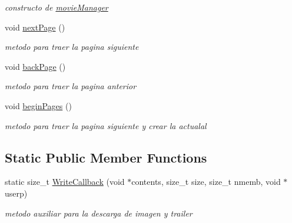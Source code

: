 \begin{DoxyCompactItemize}
\begin{DoxyCompactList}\small\item\em constructo de \hyperlink{classmovieManager}{movie\+Manager} \end{DoxyCompactList}\item 
\mbox{\label{classmovieManager_aa1111fc34f5a18cb534f55bf3dcdf0ac}} 
void \hyperlink{classmovieManager_aa1111fc34f5a18cb534f55bf3dcdf0ac}{next\+Page} ()
\begin{DoxyCompactList}\small\item\em metodo para traer la pagina siguiente \end{DoxyCompactList}\item 
\mbox{\label{classmovieManager_a4f3757c2b1d012f999fe46341a203ade}} 
void \hyperlink{classmovieManager_a4f3757c2b1d012f999fe46341a203ade}{back\+Page} ()
\begin{DoxyCompactList}\small\item\em metodo para traer la pagina anterior \end{DoxyCompactList}\item 
\mbox{\label{classmovieManager_a539ca58a4db59dac258e0b56ed1b7a3a}} 
void \hyperlink{classmovieManager_a539ca58a4db59dac258e0b56ed1b7a3a}{begin\+Pages} ()
\begin{DoxyCompactList}\small\item\em metodo para traer la pagina siguiente y crear la actualal \end{DoxyCompactList}\end{DoxyCompactItemize}
\subsection*{Static Public Member Functions}
\begin{DoxyCompactItemize}
\item 
static size\+\_\+t \hyperlink{classmovieManager_a44ea56d8c9842242b54a68e891842e14}{Write\+Callback} (void $\ast$contents, size\+\_\+t size, size\+\_\+t nmemb, void $\ast$userp)
\begin{DoxyCompactList}\small\item\em metodo auxiliar para la descarga de imagen y trailer \end{DoxyCompactList}\end{DoxyCompactItemize}


